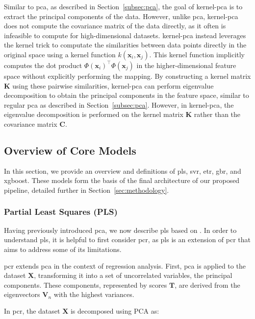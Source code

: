 Similar to \gls{pca}, as described in Section~\ref{subsec:pca}, the goal of \gls{kernel-pca} is to extract the principal components of the data.
However, unlike \gls{pca}, \gls{kernel-pca} does not compute the covariance matrix of the data directly, as it often is infeasible to compute for high-dimensional datasets.
\gls{kernel-pca} instead leverages the kernel trick to computate the similarities between data points directly in the original space using a kernel function $k(\mathbf{x}_i, \mathbf{x}_j)$.
This kernel function implicitly computes the dot product $\Phi(\mathbf{x}_i)^\top \Phi(\mathbf{x}_j)$ in the higher-dimensional feature space without explicitly performing the mapping.
By constructing a kernel matrix $\mathbf{K}$ using these pairwise similarities, \gls{kernel-pca} can perform eigenvalue decomposition to obtain the principal components in the feature space, similar to regular \gls{pca} as described in Section~\ref{subsec:pca}.
However, in \gls{kernel-pca}, the eigenvalue decomposition is performed on the kernel matrix $\mathbf{K}$ rather than the covariance matrix $\mathbf{C}$.

\subsection{Overview of Core Models}
In this section, we provide an overview and definitions of \gls{pls}, \gls{svr}, \gls{etr}, \gls{gbr}, and \gls{xgboost}.
These models form the basis of the final architecture of our proposed pipeline, detailed further in Section~\ref{sec:methodology}.

\subsubsection{Partial Least Squares (PLS)}
Having previously introduced \gls{pca}, we now describe \gls{pls} based on \citet{James2023AnIS}.
In order to understand \gls{pls}, it is helpful to first consider \gls{pcr}, as \gls{pls} is an extension of \gls{pcr} that aims to address some of its limitations.

\gls{pcr} extends \gls{pca} in the context of regression analysis.
First, \gls{pca} is applied to the dataset $\mathbf{X}$, transforming it into a set of uncorrelated variables, the principal components.
These components, represented by scores $\mathbf{T}$, are derived from the eigenvectors $\mathbf{V}_n$ with the highest variances.

In \gls{pcr}, the dataset $\mathbf{X}$ is decomposed using PCA as:

